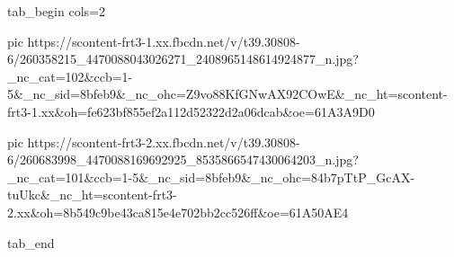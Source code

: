  
 
 
 
 

\ifcmt
  tab_begin cols=2

     pic https://scontent-frt3-1.xx.fbcdn.net/v/t39.30808-6/260358215_4470088043026271_2408965148614924877_n.jpg?_nc_cat=102&ccb=1-5&_nc_sid=8bfeb9&_nc_ohc=Z9vo88KfGNwAX92COwE&_nc_ht=scontent-frt3-1.xx&oh=fe623bf855ef2a112d52322d2a06dcab&oe=61A3A9D0

     pic https://scontent-frt3-2.xx.fbcdn.net/v/t39.30808-6/260683998_4470088169692925_8535866547430064203_n.jpg?_nc_cat=101&ccb=1-5&_nc_sid=8bfeb9&_nc_ohc=84b7pTtP_GcAX-tuUkc&_nc_ht=scontent-frt3-2.xx&oh=8b549c9be43ca815e4e702bb2cc526ff&oe=61A50AE4

  tab_end
\fi

